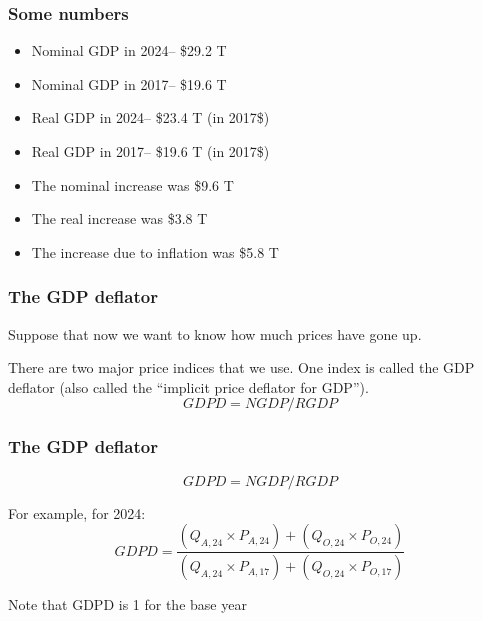 \documentclass[aspectratio=169]{beamer}
\newenvironment{wideitemize}{\itemize\addtolength{\itemsep}{10pt}}{\enditemize}
\newcommand{\lastyear}{2024}
\newcommand{\baseyear}{2017}
\newcommand{\baseyearshort}{17}
\newcommand{\lastyearshort}{24}
\begin{document}
\begin{frame}
\frametitle{Some numbers}
\begin{itemize}
\item Nominal GDP in \lastyear -- \$29.2 T
\item Nominal GDP in \baseyear -- \$19.6 T

\item Real GDP in \lastyear -- \$23.4 T (in \baseyear \$)
\item Real GDP in \baseyear -- \$19.6 T (in \baseyear \$)
\vspace{11pt}
\item The nominal increase was \$9.6 T
\item The real increase was \$3.8 T
\item The increase due to inflation was \$5.8 T
\end{itemize}

\end{frame}


\begin{frame}
\frametitle{The GDP deflator}

\begin{wideitemize}
\item Suppose that now we want to know how much prices have gone up.
\item There are two major price indices that we use.  One index is called the GDP deflator (also called the ``implicit price deflator for GDP'').
\end{wideitemize}
\begin{equation*}
GDPD = NGDP / RGDP
\end{equation*}
\end{frame}


\begin{frame}
\frametitle{The GDP deflator}

\begin{equation*}
GDPD = NGDP / RGDP
\end{equation*}

\begin{wideitemize}
\item For example, for \lastyear:
\begin{equation*}
GDPD = \frac{(Q_{A,\lastyearshort} \times P_{A,\lastyearshort})  +  (Q_{O,\lastyearshort} \times P_{O,\lastyearshort})}
{(Q_{A,\lastyearshort} \times P_{A,\baseyearshort})  +  (Q_{O,\lastyearshort} \times P_{O,\baseyearshort})}
\end{equation*}

\item Note that GDPD is 1 for the base year
\end{wideitemize}
\end{frame}
\end{document}
